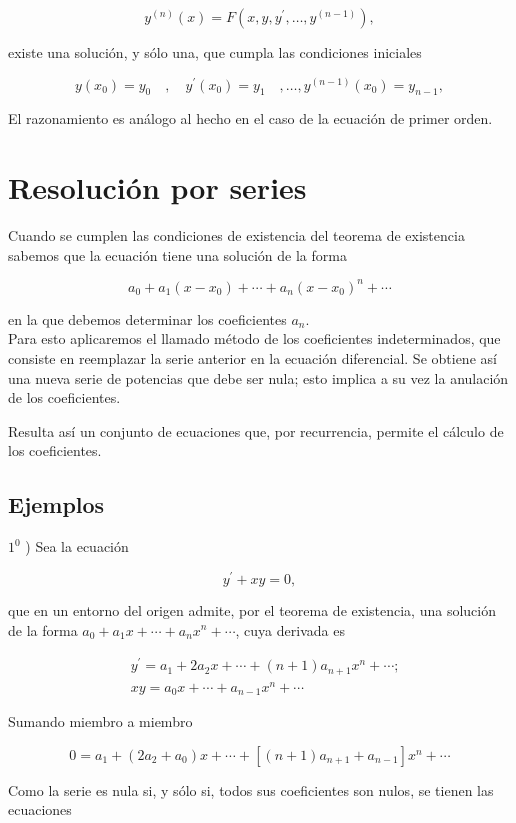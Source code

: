 \documentclass[10pt]{article}
\theoremstyle{plain}
\theoremstyle{definition}
\theoremstyle{remark}
\begin{document}
$$
y^{(n)}(x)=F\left(x, y, y^{\prime}, \ldots, y^{(n-1)}\right),
$$

existe una solución, y sólo una, que cumpla las condiciones iniciales

$$
y\left(x_{0}\right)=y_{0} \quad, \quad y^{\prime}\left(x_{0}\right)=y_{1} \quad, \ldots, y^{(n-1)}\left(x_{0}\right)=y_{n-1},
$$

El razonamiento es análogo al hecho en el caso de la ecuación de primer orden.

\section{Resolución por series}
Cuando se cumplen las condiciones de existencia del teorema de existencia sabemos que la ecuación tiene una solución de la forma

$$
a_{0}+a_{1}\left(x-x_{0}\right)+\cdots+a_{n}\left(x-x_{0}\right)^{n}+\cdots
$$

en la que debemos determinar los coeficientes $a_{n}$.\\
Para esto aplicaremos el llamado método de los coeficientes indeterminados, que consiste en reemplazar la serie anterior en la ecuación diferencial. Se obtiene así una nueva serie de potencias que debe ser nula; esto implica a su vez la anulación de los coeficientes.

Resulta así un conjunto de ecuaciones que, por recurrencia, permite el cálculo de los coeficientes.

\subsection{Ejemplos}
$1^{0}$ ) Sea la ecuación

$$
y^{\prime}+x y=0,
$$

que en un entorno del origen admite, por el teorema de existencia, una solución de la forma $a_{0}+a_{1} x+\cdots+a_{n} x^{n}+\cdots$, cuya derivada es

$$
\begin{aligned}
& y^{\prime}=a_{1}+2 a_{2} x+\cdots+(n+1) a_{n+1} x^{n}+\cdots ; \\
& x y=a_{0} x+\cdots+a_{n-1} x^{n}+\cdots
\end{aligned}
$$

Sumando miembro a miembro

$$
0=a_{1}+\left(2 a_{2}+a_{0}\right) x+\cdots+\left[(n+1) a_{n+1}+a_{n-1}\right] x^{n}+\cdots
$$

Como la serie es nula si, y sólo si, todos sus coeficientes son nulos, se tienen las ecuaciones
\end{document}
